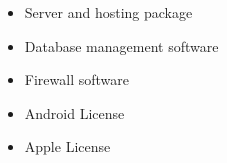 \begin{itemize}
	\item Server and hosting package
	\item Database management software 
	\item Firewall software
	\item Android License 
	\item Apple License
\end{itemize}

